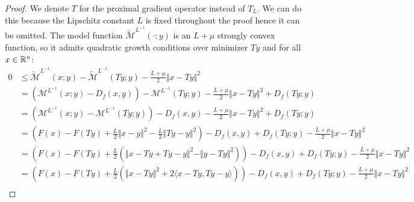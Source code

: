 \documentclass[12pt]{article}
\begin{document}
    \begin{proof}
        We denote $T$ for the proximal gradient operator instead of $T_L$. 
        We can do this because the Lipschitz constant $L$ is fixed throughout the proof hence it can be omitted. 
        The model function $\widetilde{\mathcal M}^{L^{-1}}(\cdot; y)$ is an $L + \mu$ strongly convex function, so it admits quadratic growth conditions over minimizer $Ty$ and for all $x \in \mathbb R^n$: 
        {\smaller
        \begin{align*}
            0 &\le 
            \widetilde{\mathcal M}^{L^{-1}}(x; y) - 
            \widetilde{\mathcal M}^{L^{-1}}(Ty; y)
            - 
            \frac{L + \mu}{2}\Vert x - Ty\Vert^2
            \\
            &= 
            \left(
                \mathcal M^{L^{-1}}(x; y) - D_f(x, y)
            \right) - 
            \mathcal M^{L^{-1}}(Ty; y) 
            - 
            \frac{L + \mu}{2}\Vert x - Ty\Vert^2
            + D_f(Ty; y)
            \\
            &=
            \left(
                \mathcal M^{L^{-1}}(x; y)
                - 
                \mathcal M^{L^{-1}}(Ty; y)
            \right)
            - 
            D_f(x, y) 
            - \frac{L + \mu}{2}\Vert x - Ty\Vert^2
            + D_f(Ty; y)
            \\
            &=
            \left(
                F(x) - F(Ty) 
                + 
                \frac{L}{2}\Vert x - y\Vert^2 - 
                \frac{L}{2}\Vert Ty - y\Vert^2
            \right)
            - D_f(x, y) 
            + D_f(Ty; y)
            - \frac{L + \mu}{2}\Vert x - Ty\Vert^2
            \\
            &=  
            \left(
                F(x) - F(Ty) 
                + 
                \frac{L}{2}
                \left(
                    \Vert x - Ty + Ty - y\Vert^2
                    - 
                    \Vert y - Ty\Vert^2
                \right)
            \right)
            - D_f(x, y) 
            + D_f(Ty; y)
            - \frac{L + \mu}{2}\Vert x - Ty\Vert^2
            \\
            &= 
            \left(
                F(x) - F(Ty) 
                + 
                \frac{L}{2}
                \left(
                    \Vert x - Ty\Vert^2 + 
                    2\langle x - Ty, Ty - y\rangle
                \right)
            \right)
            - D_f(x, y) 
            + D_f(Ty; y)
            - \frac{L + \mu}{2}\Vert x - Ty\Vert^2
            \\

\end{align*}}
\end{proof}
\end{document}
